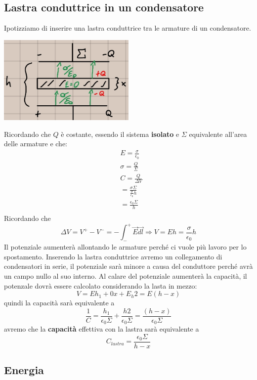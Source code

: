 \documentclass[a4paper, 12pt]{book}
\theoremstyle{plain}
\begin{document}
\subsection{Lastra conduttrice in un condensatore}

Ipotizziamo di inserire una lastra conduttrice tra le 
armature di un condensatore.
\begin{center}
    \includegraphics[width=0.5\textwidth]{lastra.jpg}
\end{center}
Ricordando che $Q$ è costante, essendo il sistema \textbf{isolato}
e $\Sigma$ equivalente all'area delle armature e che:
\[
    \begin{split}
        &E = \frac{\sigma}{\epsilon_0} \\
        &\sigma = \frac{Q}{\Sigma} \\
        &C = \frac{Q}{\Delta V} \\
        &= \frac{\sigma \Sigma}{\frac{\sigma}{\epsilon_0} h} \\
        &= \frac{\epsilon_0 \Sigma}{h} \\
    \end{split}
\]
Ricordando che \[ \Delta V = V^+ - V^- = - \int_-^+ \vec{E} \vec{dl} \Rightarrow V = Eh = \frac{\sigma}{\epsilon_0}h \] 
Il potenziale aumenterà allontando le armature perché ci vuole più 
lavoro per lo spostamento. Inserendo la lastra conduttrice
avremo un collegamento di condensatori in serie, il potenziale 
sarà minore a causa del conduttore perché avrà un campo nullo al suo interno.
Al calare del potenziale aumenterà la capacità, il potenzale
dovrà essere calcolato considerando la lasta in mezzo:
\[ V = Eh_1 + 0x + E_h2 = E(h - x) \] quindi la capacità
sarà equivalente a \[ \frac{1}{C} = \frac{h_1}{\epsilon_0 \Sigma}
+ \frac{h2}{\epsilon_0 \Sigma} = \frac{(h - x)}{\epsilon_0 \Sigma} \] 
avremo che la \textbf{capacità} effettiva con la lastra 
sarà equivalente a \[ C_{lastra} = \frac{\epsilon_0 \Sigma}{h - x} \] 

\subsection{Energia}
\end{document}
